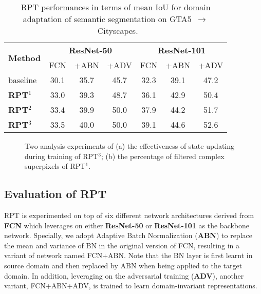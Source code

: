 \documentclass[10pt,twocolumn,letterpaper]{article}
\begin{document}
\begin{table}
   \centering
   \small
   \caption{\small RPT performances in terms of mean IoU for domain adaptation of semantic segmentation on GTA5~$\to$~Cityscapes.}
   \begin{tabular}{l|c@{~~}c@{~~}c|c@{~~}c@{~~}c} \hline
      \multirow{2}{*}{\textbf{Method}}  & \multicolumn{3}{c|}{\textbf{ResNet-50}}& \multicolumn{3}{c}{\textbf{ResNet-101}}\\
      & FCN & +ABN & +ADV & FCN & +ABN & +ADV \\ \hline
      baseline & 30.1 & 35.7 & 45.7 & 32.3 & 39.1 & 47.2 \\ \hline
      \textbf{RPT$^{1}$} & 33.0 & 39.3 & 48.7 & 36.1 & 42.9 & 50.4 \\
      \textbf{RPT$^{2}$} &  33.4 & 39.9 & 50.0 & 37.9 & 44.2 & 51.7\\
      \textbf{RPT$^{3}$} & 33.5 & 40.0 & 50.0 & 39.1 & 44.6 & 52.6\\ \hline
   \end{tabular}
   \label{tab:effectiveness}
   \vspace{-0.15in}
\end{table}

\begin{figure}[!tb]
   \centering
   \caption{\small Two analysis experiments of (a) the effectiveness of state updating during training of RPT$^{3}$; (b) the percentage of filtered complex superpixels of RPT$^{1}$.}
   \label{fig:curve}
   \vspace{-0.15in}
\end{figure}
\subsection{Evaluation of RPT}
RPT is experimented on top of six different network architectures derived from \textbf{FCN} which leverages on either \textbf{ResNet-50} or \textbf{ResNet-101} as the backbone network. Specially, we adopt Adaptive Batch Normalization (\textbf{ABN}) to replace the mean and variance of BN in the original version of FCN, resulting in a variant of network named FCN+ABN. Note that the BN layer is first learnt in source domain and then replaced by ABN when being applied to the target domain. In addition, leveraging on the adversarial training (\textbf{ADV}), another variant, FCN+ABN+ADV, is trained to learn domain-invariant representations.
\end{document}

